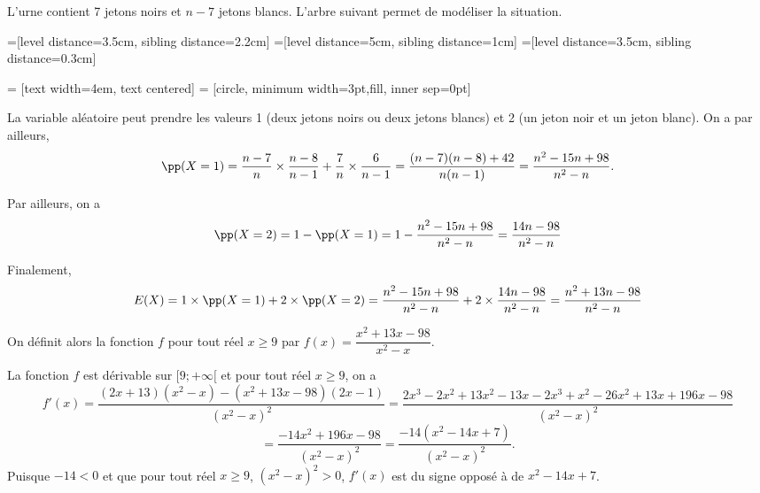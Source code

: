 \documentclass[11pt,fleqn, openany]{book} %
\begin{document}
\begin{solution}
L'urne contient 7 jetons noirs et $n-7$ jetons blancs. L'arbre suivant permet de modéliser la situation.

    =[level distance=3.5cm, sibling distance=2.2cm]
=[level distance=5cm, sibling distance=1cm]
=[level distance=3.5cm, sibling distance=0.3cm]

 = [text width=4em, text centered]
 = [circle, minimum width=3pt,fill, inner sep=0pt]


\begin{center}
\end{center}

La variable aléatoire peut prendre les valeurs 1 (deux jetons noirs ou deux jetons blancs) et 2 (un jeton noir et un jeton blanc). On a par ailleurs,
\[\pp(X=1)= \dfrac{n-7}{n} \times \dfrac{n-8}{n-1}+\dfrac{7}{n} \times \dfrac{6}{n-1}=\dfrac{(n-7)(n-8)+42}{n(n-1)}=\dfrac{n^2-15n+98}{n^2-n}.\]

Par ailleurs, on a
\[\pp(X=2)=1-\pp(X=1)=1-\dfrac{n^2-15n+98}{n^2-n}=\dfrac{14n-98}{n^2-n}\]

Finalement,
\[E(X)=1 \times \pp(X=1) + 2 \times \pp(X=2) = \dfrac{n^2-15n+98}{n^2-n} + 2 \times \dfrac{14n-98}{n^2-n} = \dfrac{n^2 +13n -98}{n^2-n}\]

On définit alors la fonction $f$ pour tout réel $x\geqslant 9$ par $f(x)=\dfrac{x^2+13x-98}{x^2-x}$.

La fonction $f$ est dérivable sur $[9;+\infty[$ et pour tout réel $x\geqslant 9$, on a 
\[f'(x)=\dfrac{(2x+13)(x^2-x)-(x^2+13x-98)(2x-1)}{(x^2-x)^2}=\dfrac{2x^3-2x^2+13x^2-13x-2x^3+x^2-26x^2+13x+196x-98}{(x^2-x)^2}\]
\[=\dfrac{-14x^2+196x-98}{(x^2-x)^2}=\dfrac{-14(x^2-14x+7)}{(x^2-x)^2}.\]
Puisque $-14<0$ et que pour tout réel $x\geqslant 9$, $(x^2-x)^2 > 0$, $f'(x)$ est du signe opposé à de $x^2-14x+7$.


\end{solution}
\end{document}
